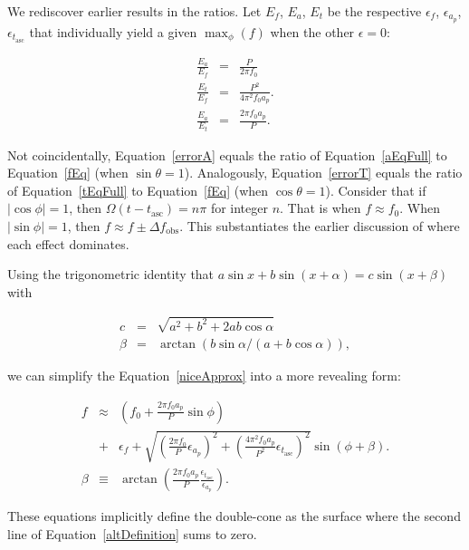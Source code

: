 \documentclass{article}
\begin{document}
We rediscover earlier results in the ratios.
Let $E_f$, $E_a$, $E_t$ be the respective $\epsilon_f$, $\epsilon_{a_p}$, $\epsilon_{t_\mathrm{asc}}$ that individually yield a given $\max_\phi (f)$ when the other $\epsilon =0$:

\begin{eqnarray}
\frac{E_a }{ E_f }  &=& \frac{P }{2 \pi f_0} \label{errorA}\\
\frac{E_t }{ E_f }  &=& \frac{P^2}{4 \pi^2 f_0 a_p}.\label{errorT}\\
\frac{E_a}{E_t} &=& \frac{2 \pi f_0 a_p}{P}.\label{errorAT}
\end{eqnarray}

\noindent Not coincidentally, Equation~\ref{errorA} equals the ratio of Equation~\ref{aEqFull} to Equation~\ref{fEq} (when $\sin \theta = 1$).
Analogously, Equation~\ref{errorT} equals the ratio of Equation~\ref{tEqFull} to Equation~\ref{fEq} (when $\cos \theta = 1$).
Consider that if $|\cos \phi| = 1$, then $\Omega (t-t_\mathrm{asc}) = n \pi$ for integer $n$.
That is when $f \approx f_0$.
When $|\sin \phi| = 1$, then $f \approx f \pm \Delta f_\mathrm{obs}$.
This substantiates the earlier discussion of where each effect dominates.

Using the trigonometric identity that $a \sin x + b\sin (x+\alpha) = c\sin(x + \beta)$ with 

\begin{eqnarray}
c &=& \sqrt{a^2 + b^2 + 2 a b \cos \alpha}\\
\beta  &=& \arctan(b \sin \alpha / (a + b \cos \alpha)),
\end{eqnarray}

\noindent we can simplify the Equation~\ref{niceApprox} into a more revealing form:

\begin{eqnarray}
f &\approx& \left(f_0 + \frac{2\pi f_0 a_p}{P} \sin \phi \right) \nonumber\\
  &+& \epsilon_f  + \sqrt{\left(\frac{2 \pi f_0}{P} \epsilon_{a_p}\right)^2 + \left(\frac{4 \pi^2 f_0 a_p}{P^2} \epsilon_{t_\mathrm{asc}}\right)^2 } \sin \left(\phi + \beta \right). \label{altDefinition}\\
\beta &\equiv& \arctan\left(\frac{2\pi f_0 a_p}{P} \frac{\epsilon_{t_\mathrm{asc}}}{\epsilon_{a_p}} \right).
\label{angleOfContact}
\end{eqnarray}

\noindent These equations implicitly define the double-cone as the surface where the second line of Equation~\ref{altDefinition} sums to zero.
\end{document}
